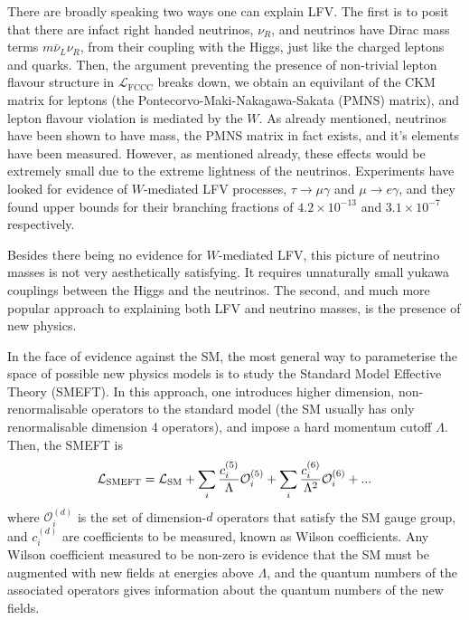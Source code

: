 There are broadly speaking two ways one can explain LFV. The first is to posit that there are infact right handed neutrinos, $\nu_R$, and neutrinos have Dirac mass terms $m\bar{\nu}_L\nu_R$, from their coupling with the Higgs, just like the charged leptons and quarks. Then, the argument preventing the presence of non-trivial lepton flavour structure in $\mathcal{L}_{\text{FCCC}}$ breaks down, we obtain an equivilant of the CKM matrix for leptons (the Pontecorvo-Maki-Nakagawa-Sakata (PMNS) matrix), and lepton flavour violation is mediated by the $W$. As already mentioned, neutrinos have been shown to have mass, the PMNS matrix in fact exists, and it's elements have been measured. However, as mentioned already, these effects would be extremely small due to the extreme lightness of the neutrinos. Experiments have looked for evidence of $W$-mediated LFV processes, $\tau\to \mu\gamma$ and $\mu\to e\gamma$, and they found upper bounds for their branching fractions of $4.2\times 10^{-13}$ \cite{Abe:2003sx} and $3.1\times 10^{-7}$ \cite{TheMEG:2016wtm} respectively.

Besides there being no evidence for $W$-mediated LFV, this picture of neutrino masses is not very aesthetically satisfying. It requires unnaturally small yukawa couplings between the Higgs and the neutrinos. The second, and much more popular approach to explaining both LFV and neutrino masses, is the presence of new physics.

In the face of evidence against the SM, the most general way to parameterise the space of possible new physics models is to study the Standard Model Effective Theory (SMEFT). In this approach, one introduces higher dimension, non-renormalisable operators to the standard model (the SM usually has only renormalisable dimension 4 operators), and impose a hard momentum cutoff $\Lambda$. Then, the SMEFT is
\begin{align}
  \mathcal{L}_{\text{SMEFT}} = \mathcal{L}_{\text{SM}} + \sum_i {c^{(5)}_i\over\Lambda} \mathcal{O}^{(5)}_i + \sum_i {c^{(6)}_i\over\Lambda^2} \mathcal{O}^{(6)}_i + ...
\end{align}
where $\mathcal{O}_i^{(d)}$ is the set of dimension-$d$ operators that satisfy the SM gauge group, and $c_i^{(d)}$ are coefficients to be measured, known as Wilson coefficients. Any Wilson coefficient measured to be non-zero is evidence that the SM must be augmented with new fields at energies above $\Lambda$, and the quantum numbers of the associated operators gives information about the quantum numbers of the new fields.

